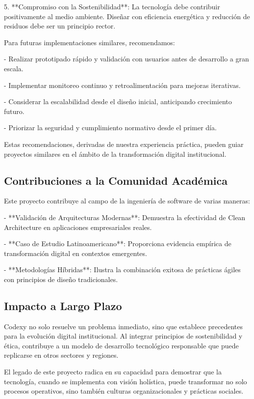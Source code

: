 5. **Compromiso con la Sostenibilidad**: La tecnología debe contribuir positivamente al medio ambiente. Diseñar con eficiencia energética y reducción de residuos debe ser un principio rector.

Para futuras implementaciones similares, recomendamos:

- Realizar prototipado rápido y validación con usuarios antes de desarrollo a gran escala.

- Implementar monitoreo continuo y retroalimentación para mejoras iterativas.

- Considerar la escalabilidad desde el diseño inicial, anticipando crecimiento futuro.

- Priorizar la seguridad y cumplimiento normativo desde el primer día.

Estas recomendaciones, derivadas de nuestra experiencia práctica, pueden guiar proyectos similares en el ámbito de la transformación digital institucional.

\subsection{Contribuciones a la Comunidad Académica}

Este proyecto contribuye al campo de la ingeniería de software de varias maneras:

- **Validación de Arquitecturas Modernas**: Demuestra la efectividad de Clean Architecture en aplicaciones empresariales reales.

- **Caso de Estudio Latinoamericano**: Proporciona evidencia empírica de transformación digital en contextos emergentes.

- **Metodologías Híbridas**: Ilustra la combinación exitosa de prácticas ágiles con principios de diseño tradicionales.

\subsection{Impacto a Largo Plazo}

Codexy no solo resuelve un problema inmediato, sino que establece precedentes para la evolución digital institucional. Al integrar principios de sostenibilidad y ética, contribuye a un modelo de desarrollo tecnológico responsable que puede replicarse en otros sectores y regiones.

El legado de este proyecto radica en su capacidad para demostrar que la tecnología, cuando se implementa con visión holística, puede transformar no solo procesos operativos, sino también culturas organizacionales y prácticas sociales.